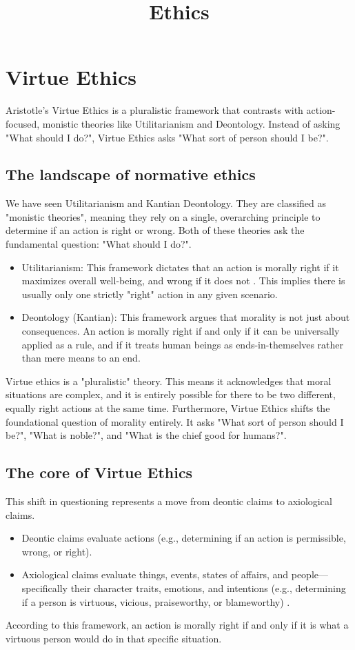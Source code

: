 \documentclass[12pt]{article}
\title{Ethics}
\date{}
\author{}
\begin{document}
\section{Virtue Ethics}
Aristotle's Virtue Ethics is a pluralistic framework that contrasts with action-focused, monistic theories like Utilitarianism and Deontology. Instead of asking "What should I do?", Virtue Ethics asks "What sort of person should I be?".
\subsection{The landscape of normative ethics}
We have seen Utilitarianism and Kantian Deontology. They are classified as "monistic theories",
meaning they rely on a single, overarching principle to determine if an action is right or wrong. Both of these theories ask the fundamental question: "What should I do?".
\begin{itemize}
    \item Utilitarianism: This framework dictates that an action is morally right if it maximizes overall well-being, and wrong if it does not . This implies there is usually only one strictly "right" action in any given scenario.
    \item Deontology (Kantian): This framework argues that morality is not just about consequences. An action is morally right if and only if it can be universally applied as a rule, and if it treats human beings as ends-in-themselves rather than mere means to an end.
\end{itemize}
Virtue ethics is a "pluralistic" theory. This means it acknowledges that moral situations are complex, and it is entirely possible for there to be two different, equally right actions at the same time. Furthermore, Virtue Ethics shifts the foundational question of morality entirely.
It asks "What sort of person should I be?", "What is noble?", and "What is the chief good for humans?".
\subsection{The core of Virtue Ethics}
This shift in questioning represents a move from deontic claims to axiological claims.
\begin{itemize}
    \item Deontic claims evaluate actions (e.g., determining if an action is permissible, wrong, or right).
    \item Axiological claims evaluate things, events, states of affairs, and people—specifically their character traits, emotions, and intentions (e.g., determining if a person is virtuous, vicious, praiseworthy, or blameworthy) .
\end{itemize}
According to this framework, an action is morally right if and only if it is what a virtuous person would do in that specific situation.
\end{document}
